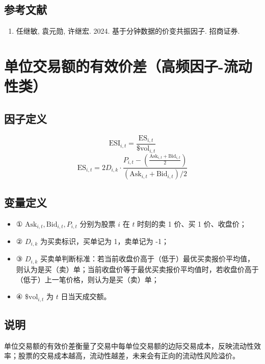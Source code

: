 \documentclass{article}
\begin{document}
\subsection{参考文献}
\begin{enumerate}
    \item 任继敏, 袁元勋, 许继宏. 2024. 基于分钟数据的价变共振因子. 招商证券.
\end{enumerate}

\section{单位交易额的有效价差（高频因子-流动性类）}

\subsection{因子定义}
\begin{equation}
    \mathrm{ESI}_{i,t} = \frac{\mathrm{ES}_{i,t}}{\$ \mathrm{vol}_{i,t}}
\end{equation}
\begin{equation}
    \mathrm{ES}_{i,t} = 2 D_{i,k} \cdot \frac{P_{i,t} - \left( \frac{\mathrm{Ask}_{i,t} + \mathrm{Bid}_{i,t}}{2} \right)}{\left( \mathrm{Ask}_{i,t} + \mathrm{Bid}_{i,t} \right)/2}
\end{equation}

\subsection{变量定义}
\begin{itemize}
    \item ① \( \mathrm{Ask}_{i,t}, \mathrm{Bid}_{i,t}, P_{i,t} \) 分别为股票 \( i \) 在 \( t \) 时刻的卖 1 价、买 1 价、收盘价；
    \item ② \( D_{i,k} \) 为买卖标识，买单记为 1，卖单记为 -1；
    \item ③ \( D_{i,k} \) 买卖单判断标准：若当前收盘价高于（低于）最优买卖报价平均值，则认为是买（卖）单；当前收盘价等于最优买卖报价平均值时，若收盘价高于（低于）上一笔价格，则认为是买（卖）单；
    \item ④ \( \$ \mathrm{vol}_{i,t} \) 为 \( t \) 日当天成交额。
\end{itemize}

\subsection{说明}
单位交易额的有效价差衡量了交易中每单位交易额的边际交易成本，反映流动性效率；股票的交易成本越高，流动性越差，未来会有正向的流动性风险溢价。
\end{document}
